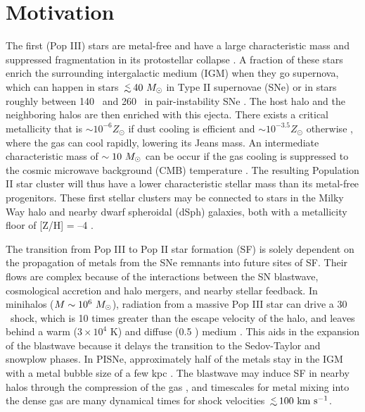 \documentclass[12pt,preprint]{aastex}
\newcommand{\kms}{\ifmmode{{\rm km~s^{-1}}}\else{km s$^{-1}$}\fi}
\newcommand{\cubecm}{\ifmmode{{\rm cm^{-3}}}\else{cm$^{-3}$}\fi}
\newcommand{\lsim}{\lower0.3em\hbox{$\,\buildrel <\over\sim\,$}}
\newcommand{\Ms}{\ifmmode{M_\odot}\else{$M_\odot$}\fi}
\begin{document}

\section{Motivation}

The first (Pop III) stars are metal-free and have a large
characteristic mass and suppressed fragmentation in its protostellar
collapse \citep{ABN02, Bromm02_P3, OShea07a}.  A fraction of these
stars enrich the surrounding intergalactic medium (IGM) when they go
supernova, which can happen in stars $\lsim 40~\Ms$ in Type II
supernovae (SNe) or in stars roughly between 140 \Ms~and 260 \Ms~in
pair-instability SNe \citep[PISNe;][]{2002ApJ...567..532H}.  The host
halo and the neighboring halos are then enriched with this ejecta.
There exists a critical metallicity that is $\sim 10^{-6} Z_\odot$ if
dust cooling is efficient \citep{Omukai05, Schneider06_Frag, clark08}
and $\sim 10^{-3.5} Z_\odot$ otherwise \citep{Bromm01,
  2009ApJ...691..441S}, where the gas can cool rapidly, lowering its
Jeans mass.  An intermediate characteristic mass of $\sim10~\Ms$ can
be occur if the gas cooling is suppressed to the cosmic microwave
background (CMB) temperature \citep{Larson98, Tumlinson07_IMF,
  2009ApJ...691..441S}.  The resulting Population II star cluster will
thus have a lower characteristic stellar mass than its metal-free
progenitors.  These first stellar clusters may be connected to stars
in the Milky Way halo and nearby dwarf spheroidal (dSph) galaxies,
both with a metallicity floor of [Z/H] = --4 \citep{Beers05,
  Tafelmeyer10, Frebel10_Obs}.

The transition from Pop III to Pop II star formation (SF) is solely
dependent on the propagation of metals from the SNe remnants into
future sites of SF.  Their flows are complex because of the
interactions between the SN blastwave, cosmological accretion and halo
mergers, and nearby stellar feedback.  In minihalos ($M \sim
10^6~\Ms$), radiation from a massive Pop III star can drive a 30
\kms~shock, which is 10 times greater than the escape velocity of the
halo, and leaves behind a warm ($3 \times 10^4$ K) and diffuse (0.5
\cubecm) medium \citep{Kitayama04, Whalen04, Abel07}.  This aids in the
expansion of the blastwave because it delays the transition to the
Sedov-Taylor and snowplow phases.  In PISNe, approximately half of the
metals stay in the IGM with a metal bubble size of a few kpc
\citep{Wise08_Gal, Greif10}.  The blastwave may induce SF in nearby
halos through the compression of the gas \citep{Ferrara98}, and
timescales for metal mixing into the dense gas are many dynamical
times \citep{Cen08} for shock velocities $\lsim100~\kms$.
\end{document}

